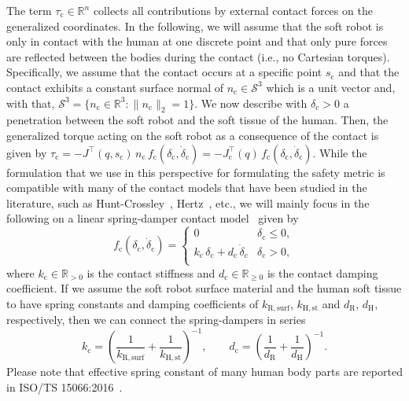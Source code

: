 The term $\tau_\mathrm{c} \in \mathbb{R}^n$ collects all contributions by external contact forces on the generalized coordinates.
In the following, we will assume that the soft robot is only in contact with the human at one discrete point and that only pure forces are reflected between the bodies during the contact (i.e., no Cartesian torques).
Specifically, we assume that the contact occurs at a specific point $s_\mathrm{c}$ and that the contact exhibits a constant surface normal of $n_\mathrm{c} \in \mathcal{S}^3$ which is a unit vector and, with that, $\mathcal{S}^3 = \{ n_\mathrm{c} \in \mathbb{R}^3: \lVert n_\mathrm{c} \rVert_2 = 1 \}$.
We now describe with $\delta_\mathrm{c} > 0$ a penetration between the soft robot and the soft tissue of the human.
Then, the generalized torque acting on the soft robot as a consequence of the contact is given by $\tau_\mathrm{c} = -J^\top(q,s_\mathrm{c}) \, n_\mathrm{c} \, f_\mathrm{c}(\delta_\mathrm{c}, \dot{\delta}_\mathrm{c}) = -J_\mathrm{c}^\top(q) \, f_\mathrm{c}(\delta_\mathrm{c}, \dot{\delta}_\mathrm{c})$.
While the formulation that we use in this perspective for formulating the safety metric is compatible with many of the contact models that have been studied in the literature, such as Hunt-Crossley~\citep{hunt1975coefficient, aouaj2021predicting}, Hertz~\citep{johnson1987contact, park2011designing, she2020comparative}, etc., we will mainly focus in the following on a linear spring-damper contact model~\citep{iso2016collaborative, haddadin2009requirements} given by
\begin{equation}
    f_\mathrm{c}(\delta_\mathrm{c}, \dot{\delta}_\mathrm{c}) =
    \begin{cases}
        0 & \delta_\mathrm{c} \leq 0,\\
        k_\mathrm{c} \, \delta_\mathrm{c} + d_\mathrm{c} \, \dot{\delta}_\mathrm{c} & \delta_\mathrm{c} > 0,\\
    \end{cases}
\end{equation}
where $k_\mathrm{c} \in \mathbb{R}_{>0}$ is the contact stiffness and $d_\mathrm{c} \in \mathbb{R}_{\geq 0}$ is the contact damping coefficient.
If we assume the soft robot surface material and the human soft tissue to have spring constants and damping coefficients of $k_\mathrm{R,surf}$, $k_\mathrm{H,st}$ and $d_\mathrm{R}$, $d_\mathrm{H}$, respectively, then we can connect the spring-dampers in series
\begin{equation}
    k_\mathrm{c} = \left (\frac{1}{k_\mathrm{R,surf}} + \frac{1}{k_\mathrm{H,st}} \right )^{-1},
    \qquad
    d_\mathrm{c} = \left (\frac{1}{d_\mathrm{R}} + \frac{1}{d_\mathrm{H}} \right )^{-1}.
\end{equation}
Please note that effective spring constant of many human body parts are reported in ISO/TS 15066:2016~\citep{iso2016collaborative}.

